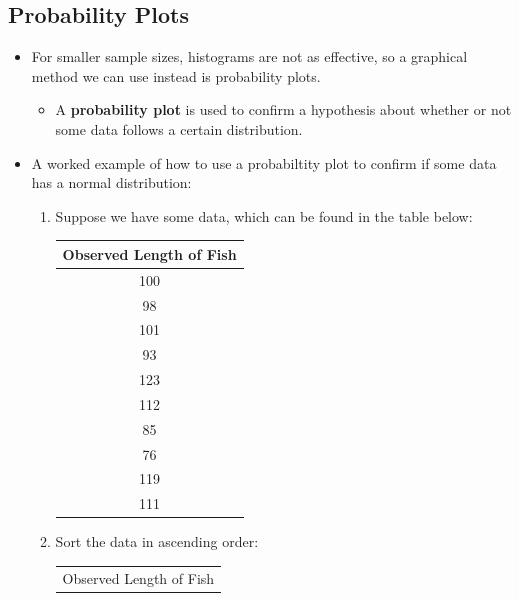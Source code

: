 \documentclass[12pt]{article}
\begin{document}
\subsection*{Probability Plots}
\begin{itemize}
	\item For smaller sample sizes, histograms are not as effective, so
	      a graphical method we can use instead is probability plots.
	      \begin{itemize}
		      \item A \textbf{probability plot }is used to confirm a hypothesis about
		            whether or not some data follows a certain distribution.
	      \end{itemize}
	\item A worked example of how to use a probabiltity plot to confirm if some
	      data has a normal distribution:
	      \begin{enumerate}
		      \item Suppose we have some data, which can be found in the table below:
		            \begin{center}
			            \begin{tabular}{c}
				            Observed Length of Fish \\
				            \hline
				            100                     \\
				            98                      \\
				            101                     \\
				            93                      \\
				            123                     \\
				            112                     \\
				            85                      \\
				            76                      \\
				            119                     \\
				            111                     \\
			            \end{tabular}
		            \end{center}
		      \item Sort the data in ascending order:
		            \begin{center}
			            \begin{tabular}{c}
				            Observed Length of Fish \\

\end{tabular}
\end{center}
\end{enumerate}
\end{itemize}
\end{document}
